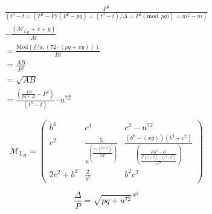 \begin{equation} \label{eq:monolithic_constraint}
\begin{split}
\frac{P^2}{(t^3-t = (P^3-P/(P^2-pq) = (t^3-t)/\Delta = P^2\pmod{pq}) = m^2-m)} \\
- \frac{\left( \mathcal{M}_{L_H} + x + y \right)}{At} \\
= \frac{\text{Mod}(f/u, (72 \cdot (pq+xy)))}{Bt} \\
= \frac{AB}{P^2} \\
= \sqrt{AB} \\
= \frac{\left(\frac{AB}{pq+\Delta} - P^2\right)}{(t^3-t)} \cdot u^{72}
\end{split}
\end{equation}

\begin{equation}
\mathcal{M}_{L_H} = 
\begin{pmatrix}
b^4 & c^4 & c^2-u^{72} \\
c^2 & \frac{5}{u^{\left(\frac{s=(b^{2c^2}c^{b^4})^2}{72P^2}\right)}} & \frac{(b^6-(xy))(b^4+c^2)}{\left(\frac{c^2b^6-c^2}{\frac{b^2(c^2+b^2)-(c^2-b^2)}{\sqrt{c^4}}}\right)} \\
2c^2+b^2 & \frac{2}{b^2} & b^2c^2
\end{pmatrix}
\end{equation}

\begin{equation}
\frac{\Delta}{P} = \sqrt{pq + u^{72}}^{\,x^2}
\end{equation}
